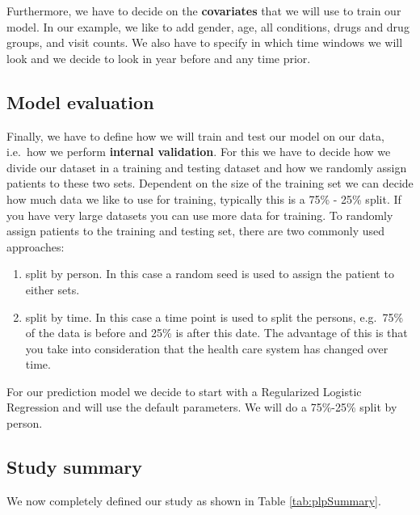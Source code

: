 \documentclass[11pt]{book}
\providecommand{\tightlist}{%
  \setlength{\itemsep}{0pt}\setlength{\parskip}{0pt}}
\begin{document}
Furthermore, we have to decide on the \textbf{covariates} that we will
use to train our model. In our example, we like to add gender, age, all
conditions, drugs and drug groups, and visit counts. We also have to
specify in which time windows we will look and we decide to look in year
before and any time prior.

\subsection{Model evaluation}\label{model-evaluation}

Finally, we have to define how we will train and test our model on our
data, i.e.~how we perform \textbf{internal validation}. For this we have
to decide how we divide our dataset in a training and testing dataset
and how we randomly assign patients to these two sets. Dependent on the
size of the training set we can decide how much data we like to use for
training, typically this is a 75\% - 25\% split. If you have very large
datasets you can use more data for training. To randomly assign patients
to the training and testing set, there are two commonly used approaches:

\begin{enumerate}
\def\labelenumi{\arabic{enumi}.}
\tightlist
\item
  split by person. In this case a random seed is used to assign the
  patient to either sets.
\item
  split by time. In this case a time point is used to split the persons,
  e.g.~75\% of the data is before and 25\% is after this date. The
  advantage of this is that you take into consideration that the health
  care system has changed over time.
\end{enumerate}

For our prediction model we decide to start with a Regularized Logistic
Regression and will use the default parameters. We will do a 75\%-25\%
split by person.

\subsection{Study summary}\label{study-summary-1}

We now completely defined our study as shown in Table
\ref{tab:plpSummary}.
\end{document}
